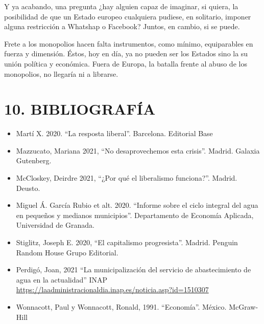 \documentclass[
]{article}
\begin{document}
Y ya acabando, una pregunta ¿hay alguien capaz de imaginar, si quiera,
la posibilidad de que un Estado europeo cualquiera pudiese, en
solitario, imponer alguna restricción a Whatshap o Facebook? Juntos, en
cambio, si se puede.

Frete a los monopolios hacen falta instrumentos, como mínimo,
equiparables en fuerza y dimensión. Éstos, hoy en día, ya no pueden ser
los Estados sino la su unión política y económica. Fuera de Europa, la
batalla frente al abuso de los monopolios, no llegaría ni a librarse.

\hypertarget{bibliografuxeda}{%
\section{10. BIBLIOGRAFÍA}\label{bibliografuxeda}}

\begin{itemize}
\item
  Martí X. 2020. ``La resposta liberal''. Barcelona. Editorial Base
\item
  Mazzucato, Mariana 2021, ``No desaprovechemos esta crisis''. Madrid.
  Galaxia Gutenberg.
\item
  McCloskey, Deirdre 2021, ``¿Por qué el liberalismo funciona?''.
  Madrid. Deusto.
\item
  Miguel Á. García Rubio et alt. 2020. ``Informe sobre el ciclo integral
  del agua en pequeños y medianos municipios''. Departamento de Economía
  Aplicada, Universidad de Granada.
\item
  Stiglitz, Joseph E. 2020, ``El capitalismo progresista''. Madrid.
  Penguin Random House Grupo Editorial.
\item
  Perdigó, Joan, 2021 ``La municipalización del servicio de
  abastecimiento de agua en la actualidad'' INAP
  \url{https://laadministracionaldia.inap.es/noticia.asp?id=1510307}
\item
  Wonnacott, Paul y Wonnacott, Ronald, 1991. ``Economía''. México.
  McGraw-Hill
\end{itemize}
\end{document}
